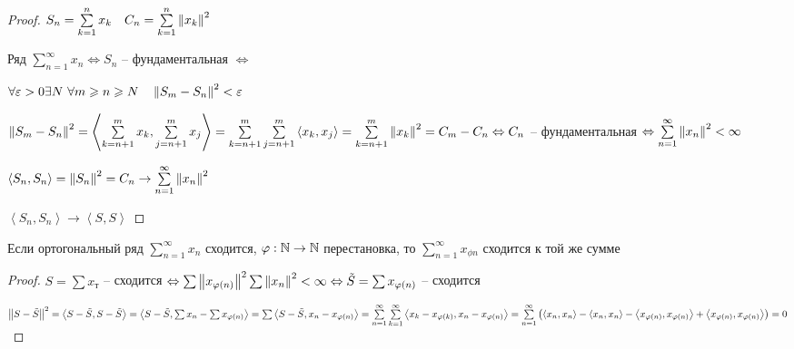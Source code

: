 \begin{proof}\thmslashn
	
	$S_n = \sum\limits_{k = 1}^n x_k   \quad C_n =  \sum\limits_{k = 1}^n \left\|x_k\right\|^2$
	
	Ряд $ \sum\limits_{n = 1}^\infty x_n \Leftrightarrow S_n$ -- фундаментальная $\Leftrightarrow$
	
	$\forall \varepsilon > 0 \exists N\,\, \forall m \geqslant n \geqslant N \quad \left\|S_m - S_n\right\|^2 < \varepsilon$
	
	$\left\|S_m - S_n\right\|^2 = \left\langle \sum\limits_{k = n+1}^m x_k,  \sum\limits_{j = n+1}^m x_j\right\rangle =  \sum\limits_{k = n+1}^m \sum\limits_{j = n+1}^m \left\langle x_k, x_j \right\rangle =  \sum\limits_{k = n+1}^m \left\|x_k\right\|^2 = C_m - C_n \Leftrightarrow C_n$ -- фундаментальная $\Leftrightarrow \sum\limits_{n = 1}^\infty \left\|x_n\right\|^2 < \infty$
	
	$ \left\langle S_n, S_n \right\rangle = \left\|S_n\right\|^2 = C_n \to \sum\limits_{n = 1}^\infty \left\|x_n\right\|^2$
	
	$\left\langle S_n, S_n \right\rangle  \to \left\langle S, S \right\rangle $
	
\end{proof}

\begin{consequence}\thmslashn
	
	Если ортогональный ряд $\sum\limits_{n = 1}^\infty x_n$ сходится, $\varphi: \mathbb{N} \to \mathbb{N}$ перестановка, то $\sum\limits_{n = 1}^\infty x_{\phi{n}}$ сходится к той же сумме
	
\end{consequence}

\begin{proof}\thmslashn
	
	$S = \sum x_т$ -- сходится $\Leftrightarrow \sum \left\|x_{\varphi(n)}\right\|^2  \sum \left\|x_n\right\|^2 < \infty \Leftrightarrow \tilde{S} = \sum x_{\varphi(n)}$ -- сходится
	
	$\left\|S - \tilde{S}\right\|^2 = \left\langle S - \tilde{S}, S - \tilde{S} \right\rangle = \left\langle S - \tilde{S}, \sum x_{n} - \sum x_{\varphi(n)} \right\rangle = \sum \left\langle S - \tilde{S}, x_n - x_{\varphi(n)} \right\rangle = \sum\limits_{n = 1}^\infty \sum\limits_{k = 1}^\infty \left\langle x_k - x_{\varphi(k)}, x_n - x_{\varphi(n)} \right\rangle = \sum\limits_{n = 1}^\infty \left(  \left\langle x_n, x_n \right\rangle - \left\langle x_n, x_n \right\rangle - \left\langle x_{\varphi(n)}, x_{\varphi(n)} \right\rangle +  \left\langle x_{\varphi(n)}, x_{\varphi(n)} \right\rangle \right) = 0$
	
\end{proof}

